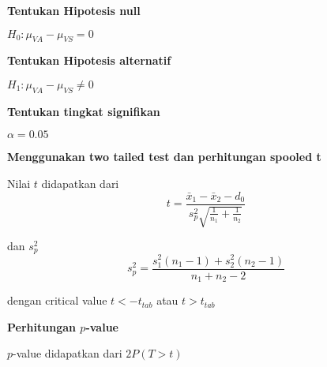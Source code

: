 \documentclass[11pt]{article}
\begin{document}
    \textbf{Tentukan Hipotesis null}

\(H_0 : \mu_{VA} - \mu_{VS} = 0\)

\textbf{Tentukan Hipotesis alternatif}

\(H_1 : \mu_{VA} - \mu_{VS} \neq 0\)

\textbf{Tentukan tingkat signifikan}

\(\alpha = 0.05\)

\textbf{Menggunakan two tailed test dan perhitungan spooled t}

Nilai \(t\) didapatkan dari
\[ t = \frac{\bar{x}_1 - \bar{x}_2 - d_0}{s^2_p \sqrt{\frac{1}{n_1} + \frac{1}{n_2}}}\]

dan \(s^2_p\)
\[ s^2_p = \frac{s^2_1 (n_1 -1) + s^2_2 (n_2-1)}{n_1+n_2 -2} \]

dengan critical value \(t < -t_{tab}\) atau \(t > t_{tab}\)

\textbf{Perhitungan \(p\)-value}

\(p\)-value didapatkan dari \(2P(T > t)\)
\end{document}
